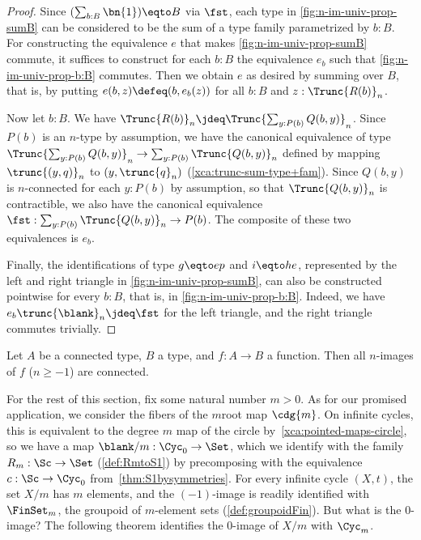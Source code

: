 \begin{proof}
Since $(\sum_{b:B}\bn{1}) \eqto B$ via $\fst$,
each type in \cref{fig:n-im-univ-prop-sumB}
can be considered to be the sum of a type family parametrized by $b:B$.
For constructing the equivalence $e$ that makes
\cref{fig:n-im-univ-prop-sumB} commute, it suffices to
construct for each $b:B$ the equivalence $e_b$ such that
\cref{fig:n-im-univ-prop-b:B} commutes.
Then we obtain $e$ as desired by summing over $B$, that is,
by putting $e(b,z) \defeq (b,e_b(z))$ for all $b:B$ and $z:\Trunc{R(b)}_n$.

\begin{marginfigure}
  \noindent{}
\caption{Taking summands for $b:B$ in \cref{fig:n-im-univ-prop-sumB}.}
\label{fig:n-im-univ-prop-b:B}
\end{marginfigure}

Now let $b:B$. We have $\Trunc{R(b)}_n \jdeq \Trunc{\sum_{y:P(b)} Q(b,y)}_n$.
Since $P(b)$ is an $n$-type by assumption, we have the canonical equivalence
of type $\Trunc{\sum_{y:P(b)} Q(b,y)}_n\to\sum_{y:P(b)}\Trunc{Q(b,y)}_n$ defined
by mapping $\trunc{(y,q)}_n$ to $(y,\trunc{q}_n)$
(\cf \cref{xca:trunc-sum-type+fam}).
Since $Q(b,y)$ is $n$-connected for each $y:P(b)$ by assumption,
so that $\Trunc{Q(b,y)}_n$ is contractible,
we also have the canonical equivalence
$\fst: \sum_{y:P(b)}\Trunc{Q(b,y)}_n \to P(b)$.
The composite of these two equivalences is $e_b$.

Finally, the identifications of type $g\eqto ep$ and $i\eqto he$,
represented by the left and right triangle in \cref{fig:n-im-univ-prop-sumB},
can also be constructed pointwise for every $b:B$, that is,
in \cref{fig:n-im-univ-prop-b:B}. Indeed, we have
$e_b \trunc{\blank}_n \jdeq \fst$ for the left triangle,
and the right triangle commutes trivially.
\end{proof}

\begin{xca}\label{xca:im_preserves_conn}
Let $A$ be a connected type, $B$ a type, and $f:A\to B$ a function.
Then all $n$-images of $f$ ($n\geq-1$) are connected.
\end{xca}

For the rest of this section, fix some natural number $m>0$. As for our
promised application, we consider the fibers of the $m$\th root map $\cdg{m}$.
On infinite cycles, this is equivalent to the degree $m$ map
of the circle by~\cref{xca:pointed-maps-circle}, so we have a map
$\blank/m : \Cyc_0 \to \Set$, which we identify with the family
$R_m : \Sc \to \Set$ (\cref{def:RmtoS1}) by precomposing with the equivalence
$c : \Sc \to \Cyc_0$ from~\cref{thm:S1bysymmetries}.
For every infinite cycle $(X,t)$, the set $X/m$ has $m$ elements,
and the $(-1)$-image is readily identified with $\FinSet_m$,
the groupoid of $m$-element sets (\cref{def:groupoidFin}).
But what is the $0$-image? The following theorem identifies
the $0$-image of $X/m$ with $\Cyc_m$.

